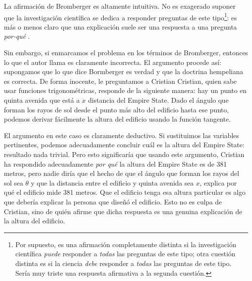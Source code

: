La afirmación de Bromberger es altamente intuitiva. No
es exagerado suponer que la investigación científica
se dedica a responder preguntas de este tipo\footnote{
	Por supuesto, es una afirmación	completamente
	distinta si la	investigación científica \emph{
	puede } responder a \emph{ todas } las	preguntas
	de este tipo; otra cuestión	distinta es si la
	ciencia \emph{ debe } responder a \emph{ todas }
	las	preguntas de este tipo. Sería muy	triste una
	respuesta afirmativa a	la segunda cuestión.
}:
es más o menos claro que una explicación suele ser una
respuesta a una pregunta \emph{ por-qué  }.

Sin embargo, si  enmarcamos el problema en los
términos de Bromberger, entonces lo que el
autor llama  es
claramente incorrecta. El argumento procede así:
supongamos que lo que dice Bormberger es verdad
y que la doctrina hempeliana es correcta. De forma
inocente, le preguntamos a Cristian  Cristian, quien sabe usar funciones
trigonométricas, responde de la siguiente manera: hay
un punto en quinta  avenida que está a $ x $ distancia
del Empire State. Dado el ángulo que forman los rayos
de sol desde el punto más alto del edificio hasta ese
punto, podemos derivar fácilmente la altura del
edificio usando la función tangente.

El argumento en este caso es claramente deductivo. Si
sustituimos las variables pertinentes, podemos
adecuadamente concluir cuál es la altura del Empire
State: resultado nada trivial. Pero esto significaría
que usando este argumento, Cristian ha respondido
adecuadamente \emph{ por qué } la altura del Empire
State es de 381 metros, pero nadie diría que el hecho
de que el ángulo que forman los rayos del sol sea $
\theta $ y que la distancia entre el edificio y quinta
avenida sea $ x $, explica por qué el edificio mide
381 metros. Que el edificio tenga esa altura
particular es algo que debería explicar la persona que
diseñó el edificio. Esto no es culpa de Cristian, sino
de quién afirme que dicha respuesta es una genuina
explicación de la altura del edificio.

